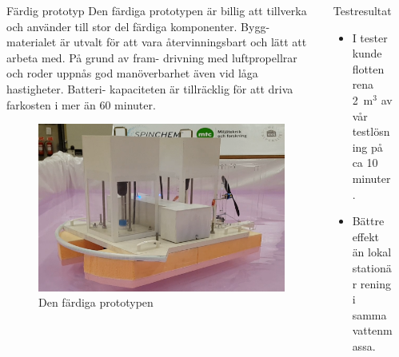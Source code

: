 \documentclass[final]{beamer}
\newlength{\onecolwid}
\begin{document}
\begin{frame}[t]
\begin{columns}[t, totalwidth=0.99\textwidth]
\begin{column}{\onecolwid}
    \end{column}
    \begin{column}{\onecolwid}

      \begin{block}{Färdig prototyp}
        Den färdiga prototypen är billig att tillverka och använder till stor del
        färdiga komponenter. Bygg- materialet är utvalt för att vara återvinningsbart
        och lätt att arbeta med.
        På grund av fram- drivning med luftpropellrar
        och roder uppnås god manöverbarhet även vid låga hastigheter.
        Batteri- kapaciteten är tillräcklig för att driva farkosten
        i mer än 60 minuter.

        \vskip 4cm
        \begin{figure}[H]
          \centering
          \hbox{\hspace{-2.5cm}\includegraphics[width=25cm]{figures/flotte.png}}
          \caption{Den färdiga prototypen}
        \end{figure}
      \end{block}

    \end{column}
    \begin{column}{\onecolwid}

      \begin{block}{Testresultat}
        \begin{itemize}
        \item I tester kunde flotten rena 2~m$^3$ av vår testlösning på ca 10 minuter.
        \item Bättre effekt än lokal stationär rening i samma vattenmassa.
        \end{itemize}


\end{block}
\end{column}
\end{columns}
\end{frame}
\end{document}
